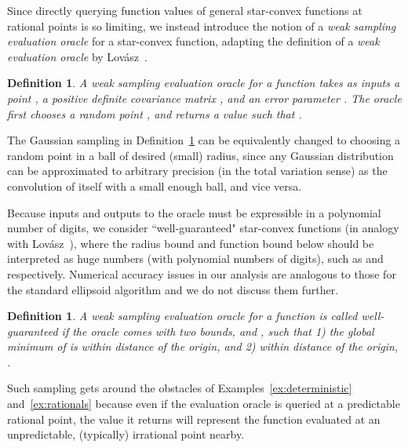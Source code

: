 \documentclass[11pt,letter]{article}
\newcounter{nTheorems}
\numberwithin{nTheorems}{section}
\newtheorem{definition}[nTheorems]{Definition}
\begin{document}
Since directly querying function values of general star-convex functions at rational points is so limiting, we instead introduce the notion of a \emph{weak sampling evaluation oracle} for a star-convex function, adapting the definition of a \emph{weak evaluation oracle} by Lov\'{a}sz~\cite{Lovasz:1987}.

\begin{definition}
\label{def:evaluation}
A \emph{weak sampling evaluation oracle} for a function  takes as inputs a point , a positive definite covariance matrix , and an error parameter . The oracle first chooses a random point , and returns a value  such that .
\end{definition}

The Gaussian sampling in Definition~\ref{def:evaluation} can be equivalently changed to choosing a random point in a ball of desired (small) radius, since any Gaussian distribution can be approximated to arbitrary precision (in the total variation sense) as the convolution of itself with a small enough ball, and vice versa. 

Because inputs and outputs to the oracle must be expressible in a polynomial number of digits, we consider ``well-guaranteed" star-convex functions (in analogy with Lov\'{a}sz~\cite{Lovasz:1987}), where the radius bound  and function bound  below should be interpreted as huge numbers (with polynomial numbers of digits), such as  and  respectively. Numerical accuracy issues in our analysis are analogous to those for the standard ellipsoid algorithm and we do not discuss them further.

\begin{definition}\label{def:boundedness}
  A weak sampling evaluation oracle for a function  is called \emph{well-guaranteed} if the oracle comes with two bounds,  and , such that 1) the global minimum of  is within distance  of the origin, and 2) within distance  of the origin, .
\end{definition}

Such sampling gets around the obstacles of Examples~\ref{ex:deterministic} and~\ref{ex:rationals} because even if the evaluation oracle is queried at a predictable rational point, the value it returns will represent the function evaluated at an unpredictable, (typically) irrational point nearby.
\end{document}
